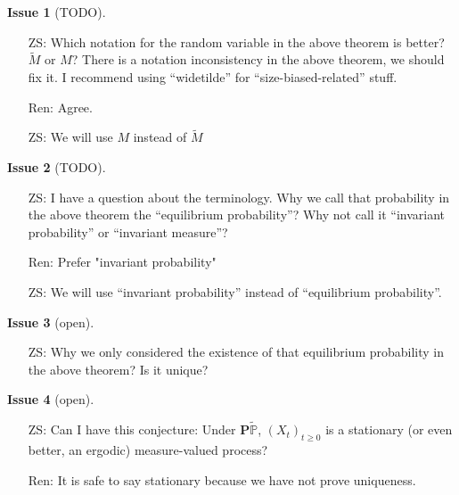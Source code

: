 \documentclass[12pt,a4paper]{amsart}
\numberwithin{equation}{section}
\theoremstyle{plain}
\theoremstyle{definition}
\newtheorem{iss}{Issue}
\begin{document}
\begin{iss}[TODO]~
  \begin{itemize}
  \item[ZS:]
    Which notation for the random variable in the above theorem is better? $\widetilde M$ or $M$? There is a notation inconsistency in the above theorem, we should fix it. I recommend using ``widetilde'' for ``size-biased-related'' stuff.
  \item[Ren:] 
Agree.
\item[ZS:]
We will use  $M$ instead of $\widetilde M$
  \end{itemize}
\end{iss}
\begin{iss}[TODO]~
  \begin{itemize}
  \item[ZS:]
I have a question about the terminology. Why we call that probability in the above theorem the ``equilibrium probability''? Why not call it ``invariant probability'' or ``invariant measure''?
\item[Ren:] Prefer "invariant probability"
\item[ZS:] We will use ``invariant probability'' instead of ``equilibrium probability''.
  \end{itemize}
\end{iss}
\begin{iss}[open]~
  \begin{itemize}
  \item[ZS:]
Why we only considered the existence of that equilibrium probability in the above theorem? Is it unique?
  \end{itemize}
\end{iss}
\begin{iss}[open]~
  \begin{itemize}
  \item[ZS:]
    Can I have this conjecture: Under $\mathbf P \widetilde{\mathbb P}$, $(X_t)_{t\geq 0}$ is a stationary (or even better, an ergodic) measure-valued process?
\item[Ren:]
  It is safe to say stationary because we have not prove uniqueness.
  \end{itemize}
\end{iss}
\end{document}
